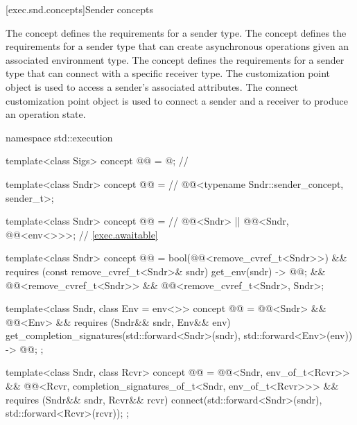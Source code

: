 [exec.snd.concepts]{Sender concepts}

\pnum
The  concept defines
the requirements for a sender type.
The  concept defines
the requirements for a sender type
that can create asynchronous operations given an associated environment type.
The  concept defines
the requirements for a sender type
that can connect with a specific receiver type.
The  customization point object is used to access
a sender's associated attributes.
The connect customization point object is used to connect
a sender and a receiver to produce an operation state.

\begin{codeblock}
namespace std::execution {
  template<class Sigs>
    concept @@ = @\seebelow@;            // \expos

  template<class Sndr>
    concept @@ =                                         // \expos
      @@<typename Sndr::sender_concept, sender_t>;

  template<class Sndr>
    concept @@ =                                     // \expos
      @@<Sndr> ||
      @@<Sndr, @@<env<>>>;                 // \ref{exec.awaitable}

  template<class Sndr>
    concept @@ =
      bool(@@<remove_cvref_t<Sndr>>) &&
      requires (const remove_cvref_t<Sndr>& sndr) {
        { get_env(sndr) } -> @@;
      } &&
      @@<remove_cvref_t<Sndr>> &&
      @@<remove_cvref_t<Sndr>, Sndr>;

  template<class Sndr, class Env = env<>>
    concept @@ =
      @@<Sndr> &&
      @@<Env> &&
      requires (Sndr&& sndr, Env&& env) {
        { get_completion_signatures(std::forward<Sndr>(sndr), std::forward<Env>(env)) }
          -> @@;
      };

  template<class Sndr, class Rcvr>
    concept @@ =
      @@<Sndr, env_of_t<Rcvr>> &&
      @@<Rcvr, completion_signatures_of_t<Sndr, env_of_t<Rcvr>>> &&
      requires (Sndr&& sndr, Rcvr&& rcvr) {
        connect(std::forward<Sndr>(sndr), std::forward<Rcvr>(rcvr));
      };
}
\end{codeblock}

